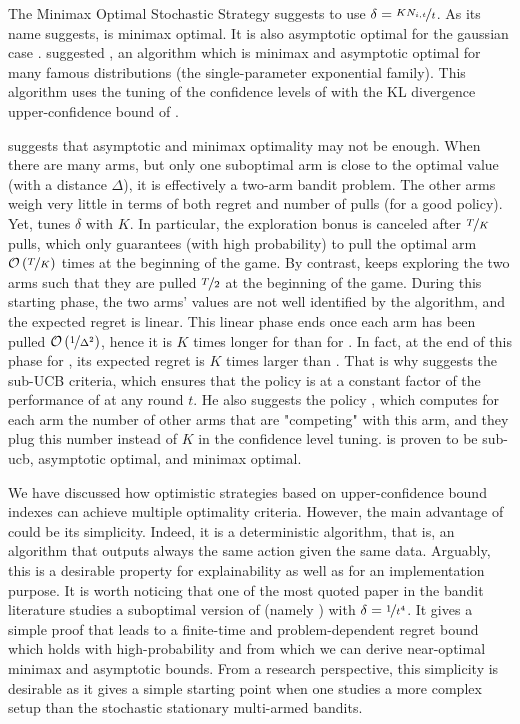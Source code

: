 {The Minimax Optimal Stochastic Strategy \MOSS \citep{audibert2009minimax, degenne2016anytime} suggests to use $\delta = \nicefrac{K N_{i,t}}{t}$. As its name suggests, \MOSS is minimax optimal. It is also asymptotic optimal for the gaussian case \citep{lattimore2020banditbook}. \citet{menard2017klucb++} suggested \KLUCBpp, an algorithm which is minimax and asymptotic optimal for many famous distributions (the single-parameter exponential family). This algorithm uses the tuning of the confidence levels of \MOSS with the KL divergence upper-confidence bound of \KLUCB.

\citet{lattimore2018refining} suggests that asymptotic and minimax optimality may not be enough. When there are many arms, but only one suboptimal arm is close to the optimal value (with a distance $\Delta$), it is effectively a two-arm bandit problem. The other arms weigh very little in terms of both regret and number of pulls (for a good policy).  Yet, \MOSS tunes $\delta$ with $K$. In particular, the exploration bonus is canceled after $\nicefrac{T}{K}$ pulls, which only guarantees (with high probability) to pull the optimal arm $\mathcal{O}\left(\nicefrac{T}{K}\right)$ times at the beginning of the game. By contrast, \UCB keeps exploring the two arms such that they are pulled $\nicefrac{T}{2}$ at the beginning of the game. During this starting phase, the two arms' values are not well identified by the algorithm, and the expected regret is linear. This linear phase ends once each arm has been pulled $\mathcal{O}\left(\nicefrac{1}{\Delta^2}\right)$, hence it is $K$ times longer for \MOSS than for \UCB. In fact, at the end of this phase for \MOSS, its expected regret is $K$ times larger than \UCB. That is why \citet{lattimore2018refining} suggests the sub-UCB criteria, which ensures that the policy is at a constant factor of the performance of \UCB at any round $t$. He also suggests the policy \ADAUCB, which computes for each arm the number of other arms that are "competing" with this arm, and they plug this number instead of $K$ in the confidence level tuning. \ADAUCB is proven to be sub-ucb, asymptotic optimal, and minimax optimal. 

We have discussed how optimistic strategies based on upper-confidence bound indexes can achieve multiple optimality criteria. However, the main advantage of \UCB could be its simplicity. Indeed, it is a deterministic algorithm, that is, an algorithm that outputs always the same action given the same data. Arguably, this is a desirable property for explainability as well as for an implementation purpose. It is worth noticing that one of the most quoted paper \citep{auer2002finite} in the bandit literature studies a suboptimal version of \UCB (namely \UCBone)  with $\delta = \nicefrac{1}{t^4}$. It gives a simple proof that leads to a finite-time and problem-dependent regret bound which holds with high-probability and from which we can derive near-optimal minimax and asymptotic bounds. From a research perspective, this simplicity is desirable as it gives a simple starting point when one studies a more complex setup than the stochastic stationary multi-armed bandits.


}
